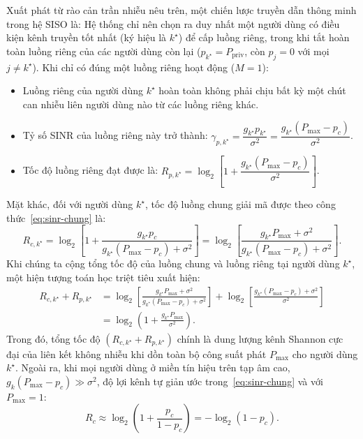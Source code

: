 Xuất phát từ rào cản trần nhiễu nêu trên, một chiến lược truyền dẫn thông minh trong hệ SISO là: Hệ thống chỉ
nên chọn ra duy nhất một người dùng có điều kiện kênh truyền tốt nhất (ký hiệu là $k^\star$) để cấp luồng
riêng, trong khi tắt hoàn toàn luồng riêng của các người dùng còn lại ($p_{k^\star} = P_{\mathrm{priv}}$, còn
$p_j = 0$ với mọi $j \neq k^\star$). Khi chỉ có đúng một luồng riêng hoạt động ($M = 1$):
\begin{itemize}
\item Luồng riêng của người dùng $k^\star$ hoàn toàn không phải chịu bất kỳ một chút can nhiễu liên người dùng
  nào từ các luồng riêng khác.
\item Tỷ số SINR của luồng riêng này trở thành: $\gamma_{p,k^\star} = \dfrac{g_{k^\star} p_{k^\star}}{\sigma^2}
  = \dfrac{g_{k^\star}(P_{\max} - p_c)}{\sigma^2}$.
\item Tốc độ luồng riêng đạt được là: $R_{p,k^\star} = \log_2\!\left[1 + \dfrac{g_{k^\star}(P_{\max} -
  p_c)}{\sigma^2}\right]$.
\end{itemize}
Mặt khác, đối với người dùng $k^\star$, tốc độ luồng chung giải mã được theo công thức~\eqref{eq:sinr-chung} là:
\begin{equation}
R_{c,k^\star} = \log_2\!\left[1 + \frac{g_{k^\star} p_c}{g_{k^\star}(P_{\max} - p_c) + \sigma^2}\right]
= \log_2\!\left[\frac{g_{k^\star} P_{\max} + \sigma^2}{g_{k^\star}(P_{\max} - p_c) + \sigma^2}\right].
\label{eq:toc-do-chung-k-sao}
\end{equation}
Khi chúng ta cộng tổng tốc độ của luồng chung và luồng riêng tại người dùng $k^\star$, một hiện tượng toán
học triệt tiêu xuất hiện:
\begin{equation}
\begin{aligned}
R_{c,k^\star} + R_{p,k^\star}
&= \log_2\!\left[\frac{g_{k^\star} P_{\max} + \sigma^2}{g_{k^\star}(P_{\max} - p_c) + \sigma^2}\right]
+ \log_2\!\left[\frac{g_{k^\star}(P_{\max} - p_c) + \sigma^2}{\sigma^2}\right]\\
&= \log_2\!\left(1 + \frac{g_{k^\star} P_{\max}}{\sigma^2}\right).
\end{aligned}
\label{eq:tong-hai-thanh-phan}
\end{equation}
Trong đó, tổng tốc độ $(R_{c,k^\star} + R_{p,k^\star})$ chính là dung lượng kênh Shannon cực đại của liên kết
không nhiễu khi dồn toàn bộ công suất phát $P_{\max}$ cho người dùng $k^\star$. Ngoài ra, khi mọi người dùng ở
miền tín hiệu trên tạp âm cao, $g_k(P_{\max} - p_c) \gg \sigma^2$, độ lợi kênh tự giản ước trong~\eqref{eq:sinr-chung}
và với $P_{\max} = 1$:
\begin{equation}
R_c \approx \log_2\!\left(1 + \frac{p_c}{1 - p_c}\right) = -\log_2(1 - p_c).
\label{eq:toc-do-chung-xap-xi}
\end{equation}

